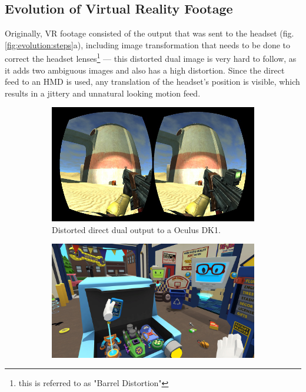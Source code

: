 \subsection{Evolution of Virtual Reality Footage}

Originally, VR footage consisted of the output that was sent to the headset 
(fig. \ref{fig:evolution:steps}a), including image transformation that needs to 
be done to correct the headset lenses\footnote{this is referred to as "Barrel 
Distortion"} --- this distorted dual image is very hard to follow, as it adds 
two ambiguous images and also has a high distortion. Since the direct feed to 
an HMD is used, any translation of the headset's position is visible, which 
results in a jittery and unnatural looking motion feed.

\begin{figure}[htbp]
	\caption{Evolution of VR presentations over the recent years}
	\label{fig:evolution:steps}
	\centering
	\begin{subfigure}[t]{.45\textwidth}
		\includegraphics[width=\textwidth]{gfx/evolution/torque3d-bdist.png}
		\caption{Distorted direct dual output to a Oculus 
		DK1\cite{wyand:torqu3d:2013}.}
	\end{subfigure}
	\begin{subfigure}[t]{.45\textwidth}
		\includegraphics[width=\textwidth]{gfx/evolution/owlch-car.png}

\end{subfigure}
\end{figure}
